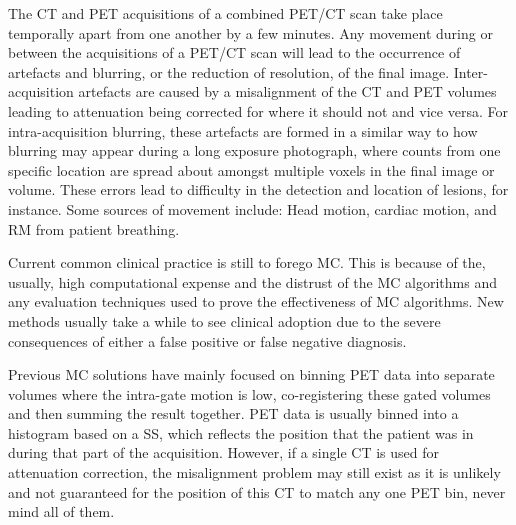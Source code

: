         The \gls{CT} and \gls{PET} acquisitions of a combined \gls{PET}/\gls{CT} scan take place temporally apart from one another by a few minutes. Any movement during or between the acquisitions of a \gls{PET}/\gls{CT} scan will lead to the occurrence of artefacts and blurring, or the reduction of resolution, of the final image. Inter-acquisition artefacts are caused by a misalignment of the \gls{CT} and \gls{PET} volumes leading to attenuation being corrected for where it should not and vice versa. For intra-acquisition blurring, these artefacts are formed in a similar way to how blurring may appear during a long exposure photograph, where counts from one specific location are spread about amongst multiple voxels in the final image or volume. These errors lead to difficulty in the detection and location of lesions, for instance. Some sources of movement include: Head motion, cardiac motion, and \gls{RM} from patient breathing.
    
        Current common clinical practice is still to forego \gls{MC}. This is because of the, usually, high computational expense and the distrust of the \gls{MC} algorithms and any evaluation techniques used to prove the effectiveness of \gls{MC} algorithms. New methods usually take a while to see clinical adoption due to the severe consequences of either a false positive or false negative diagnosis.
    
        Previous \gls{MC} solutions have mainly focused on binning \gls{PET} data into separate volumes where the intra-gate motion is low, co-registering these gated volumes and then summing the result together. \gls{PET} data is usually binned into a histogram based on a \gls{SS}, which reflects the position that the patient was in during that part of the acquisition. However, if a single \gls{CT} is used for attenuation correction, the misalignment problem may still exist as it is unlikely and not guaranteed for the position of this \gls{CT} to match any one \gls{PET} bin, never mind all of them.
        
